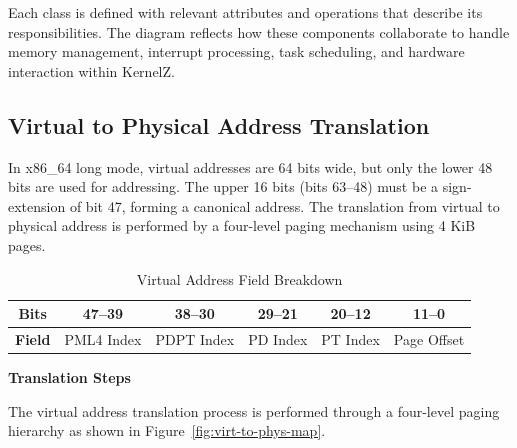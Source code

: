 \documentclass[12pt]{extarticle}
\begin{document}
Each class is defined with relevant attributes and operations that describe its responsibilities. The diagram reflects how these components collaborate to handle memory management, interrupt processing, task scheduling, and hardware interaction within KernelZ.
\pagebreak




\pagebreak  

\subsection{Virtual to Physical Address Translation}

In x86\_64 long mode, virtual addresses are 64 bits wide, but only the lower 48 bits are used for addressing. The upper 16 bits (bits 63--48) must be a sign-extension of bit 47, forming a canonical address. The translation from virtual to physical address is performed by a four-level paging mechanism using 4 KiB pages.

\begin{table}[h]
    \renewcommand{\arraystretch}{1.5} %
    \centering
    \begin{tabular}{|c|c|c|c|c|c|}
        \hline
        \textbf{Bits} & 47--39 & 38--30 & 29--21 & 20--12 & 11--0 \\
        \hline
        \textbf{Field} & PML4 Index & PDPT Index & PD Index & PT Index & Page Offset \\
        \hline
    \end{tabular}
    \caption{Virtual Address Field Breakdown}
    \label{tab:va_field_breakdown}
\end{table}

\vspace{1em}
\noindent\textbf{Translation Steps}\par
\vspace{0.5em}

The virtual address translation process is performed through a four-level paging hierarchy as shown in Figure~\ref{fig:virt-to-phys-map}.
\end{document}
